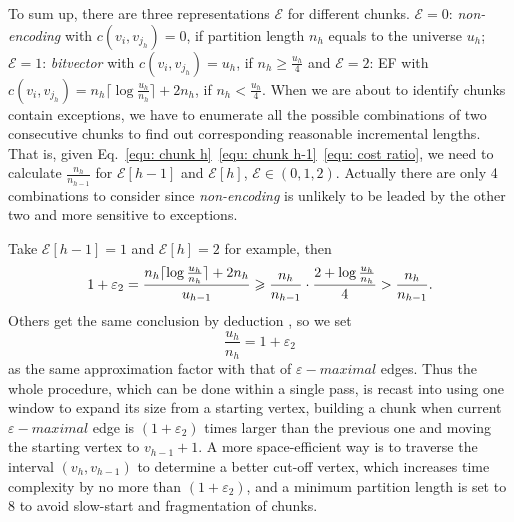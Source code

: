 \documentclass[runningheads,a4paper]{llncs}
\begin{document}
To sum up, there are three representations $ \mathcal{E} $ for different chunks. $ \mathcal{E}=0 $: \textit{non-encoding} with $c\left(v_{i},v_{j_{h}}\right)=0$, if partition length $n_{h}$ equals to the universe $u_{h}$; $ \mathcal{E}=1 $: \textit{bitvector} with $c\left(v_{i},v_{j_{h}}\right)=u_{h}$, if $n_{h}\geqslant \frac{u_{h}}{4}$ and $ \mathcal{E}=2 $: EF with $c\left(v_{i},v_{j_{h}}\right)=n_{h}\lceil\log \frac{u_{h}}{n_{h}}\rceil+2n_{h}$, if $n_{h}<\frac{u_{h}}{4}$.
When we are about to identify chunks contain exceptions, we have to enumerate all the possible combinations of two consecutive chunks to find out corresponding reasonable incremental lengths.
That is, given Eq.~\eqref{equ: chunk h}~\eqref{equ: chunk h-1}~\eqref{equ: cost ratio}, we need to calculate $ \frac{n_h}{n_{h-1}} $ for $ \mathcal{E}[h-1] $ and $ \mathcal{E}[h] $, $ \mathcal{E} \in (0,1,2) $.
Actually there are only 4 combinations to consider since \textit{non-encoding} is unlikely to be leaded by the other two and more sensitive to exceptions.

Take $ \mathcal{E}[h-1]=1 $ and $ \mathcal{E}[h]=2 $ for example, then
\begin{displaymath}
\noindent
1+\varepsilon_{2}=\frac{n_{h}\lceil\log \frac{u_{h}}{n_{h}}\rceil+2n_{h}}{u_{h-1}}\geqslant \frac{n_{h}}{n_{h-1}}\cdot \frac{2+\log \frac{u_{h}}{n_{h}}}{4}>\frac{n_{h}}{n_{h-1}}.
\end{displaymath}
Others get the same conclusion by deduction
, so we set
\begin{equation}
\frac{u_{h}}{n_{h}}=1+\varepsilon_2
\end{equation}
as the same approximation factor with that of $\varepsilon-maximal$ edges.
Thus the whole procedure, which can be done within a single pass, is recast into using one window to expand its size from a starting vertex, building a chunk when current $\varepsilon-maximal$ edge is $\left(1+\varepsilon_{2}\right)$ times larger than the previous one and moving the starting vertex to $v_{h-1}+1$. A more space-efficient way is to traverse the interval $\left(v_{h},v_{h-1}\right)$ to determine a better cut-off vertex, which increases time complexity by no more than $\left(1+\varepsilon_{2}\right)$, and a minimum partition length is set to 8 to avoid slow-start and fragmentation of chunks.
\end{document}
